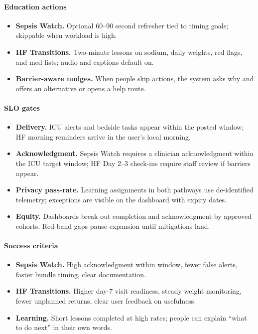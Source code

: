\documentclass[12pt]{article}
\begin{document}
\paragraph{Education actions}
\begin{itemize}[leftmargin=*]
  \item \textbf{Sepsis Watch.} Optional 60–90 second refresher tied to timing goals; skippable when workload is high.
  \item \textbf{HF Transitions.} Two-minute lessons on sodium, daily weights, red flags, and med lists; audio and captions default on.
  \item \textbf{Barrier-aware nudges.} When people skip actions, the system asks why and offers an alternative or opens a help route.
\end{itemize}

\paragraph{SLO gates}
\begin{itemize}[leftmargin=*]
  \item \textbf{Delivery.} ICU alerts and bedside tasks appear within the posted window; HF morning reminders arrive in the user’s local morning.
  \item \textbf{Acknowledgment.} Sepsis Watch requires a clinician acknowledgment within the ICU target window; HF Day 2–3 check-ins require staff review if barriers appear.
  \item \textbf{Privacy pass-rate.} Learning assignments in both pathways use de-identified telemetry; exceptions are visible on the dashboard with expiry dates.
  \item \textbf{Equity.} Dashboards break out completion and acknowledgment by approved cohorts. Red-band gaps pause expansion until mitigations land.
\end{itemize}

\paragraph{Success criteria}
\begin{itemize}[leftmargin=*]
  \item \textbf{Sepsis Watch.} High acknowledgment within window, fewer false alerts, faster bundle timing, clear documentation.
  \item \textbf{HF Transitions.} Higher day-7 visit readiness, steady weight monitoring, fewer unplanned returns, clear user feedback on usefulness.
  \item \textbf{Learning.} Short lessons completed at high rates; people can explain “what to do next” in their own words.
\end{itemize}
\end{document}
